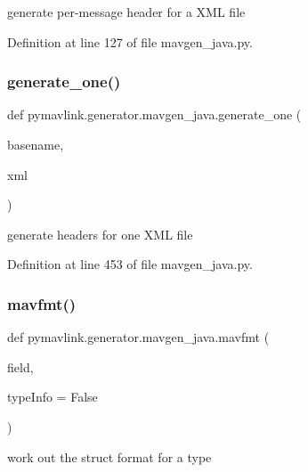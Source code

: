 \begin{DoxyVerb}generate per-message header for a XML file\end{DoxyVerb}
 

Definition at line 127 of file mavgen\+\_\+java.\+py.

\mbox{\label{namespacepymavlink_1_1generator_1_1mavgen__java_a73c50060fdb0745de2d34d37c3b5c22c}} 
\subsubsection{\texorpdfstring{generate\_one()}{generate\_one()}}
{\footnotesize\ttfamily def pymavlink.\+generator.\+mavgen\+\_\+java.\+generate\+\_\+one (\begin{DoxyParamCaption}\item[{}]{basename,  }\item[{}]{xml }\end{DoxyParamCaption})}

\begin{DoxyVerb}generate headers for one XML file\end{DoxyVerb}
 

Definition at line 453 of file mavgen\+\_\+java.\+py.

\mbox{\label{namespacepymavlink_1_1generator_1_1mavgen__java_a23f35fe059a4de4d3ebbd2e148f86931}} 
\subsubsection{\texorpdfstring{mavfmt()}{mavfmt()}}
{\footnotesize\ttfamily def pymavlink.\+generator.\+mavgen\+\_\+java.\+mavfmt (\begin{DoxyParamCaption}\item[{}]{field,  }\item[{}]{type\+Info = {\ttfamily False} }\end{DoxyParamCaption})}

\begin{DoxyVerb}work out the struct format for a type\end{DoxyVerb}
 

